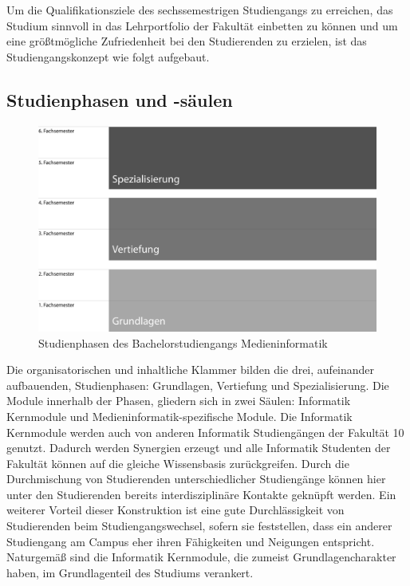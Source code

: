 Um die Qualifikationsziele des sechssemestrigen Studiengangs zu
erreichen, das Studium sinnvoll in das Lehrportfolio der Fakultät
einbetten zu können und um eine größtmögliche Zufriedenheit bei den
Studierenden zu erzielen, ist das Studiengangskonzept wie folgt
aufgebaut.

\subsection{Studienphasen und
-säulen}\label{studienphasen-und--suxe4ulen}

\begin{figure}[htbp]
\centering
\includegraphics[width=\columnwidth]{../anhaenge/bilder/ba-studienphasen.png}
\caption{Studienphasen des Bachelorstudiengangs Medieninformatik}
\end{figure}

Die organisatorischen und inhaltliche Klammer bilden die drei,
aufeinander aufbauenden, Studienphasen: Grundlagen, Vertiefung und
Spezialisierung. Die Module innerhalb der Phasen, gliedern sich in zwei
Säulen: Informatik Kernmodule und Medieninformatik-spezifische Module.
Die Informatik Kernmodule werden auch von anderen Informatik
Studiengängen der Fakultät 10 genutzt. Dadurch werden Synergien erzeugt
und alle Informatik Studenten der Fakultät können auf die gleiche
Wissensbasis zurückgreifen. Durch die Durchmischung von Studierenden
unterschiedlicher Studiengänge können hier unter den Studierenden
bereits interdisziplinäre Kontakte geknüpft werden. Ein weiterer Vorteil
dieser Konstruktion ist eine gute Durchlässigkeit von Studierenden beim
Studiengangswechsel, sofern sie feststellen, dass ein anderer
Studiengang am Campus eher ihren Fähigkeiten und Neigungen entspricht.
Naturgemäß sind die Informatik Kernmodule, die zumeist
Grundlagencharakter haben, im Grundlagenteil des Studiums verankert.

